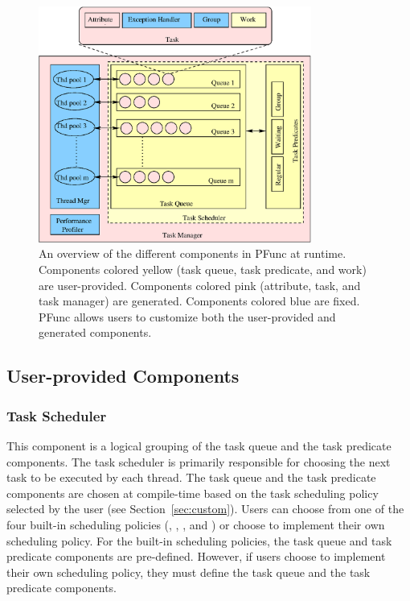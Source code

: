 \begin{figure}
\centering
\includegraphics[width=0.8\textwidth]{figs/runtime}
\caption{An overview of the different components in PFunc at runtime.
Components colored yellow (task queue, task predicate, and work) are
user-provided. Components colored pink (attribute, task, and task manager) are
generated. Components colored blue are fixed. PFunc allows users to customize
both the user-provided and generated components.}
\label{fig:runtime}
\end{figure}

\subsection{User-provided Components}
\label{subsec:user_provided}

\subsubsection{Task Scheduler}
%
This component is a logical grouping of the task queue and the task predicate
components.
%
The task scheduler is primarily responsible for choosing the next task to be
executed by each thread. 
%
The task queue and the task predicate components are chosen at compile-time
based on the task scheduling policy selected by the user (see
Section~\ref{sec:custom}).
%
Users can choose from one of the four built-in scheduling policies
(, , , and ) or choose to 
implement their own scheduling policy.
%
For the built-in scheduling policies, the task queue and task predicate
components are pre-defined.
%
However, if users choose to implement their own scheduling policy, they must 
define the task queue and the task predicate components.
%
 
